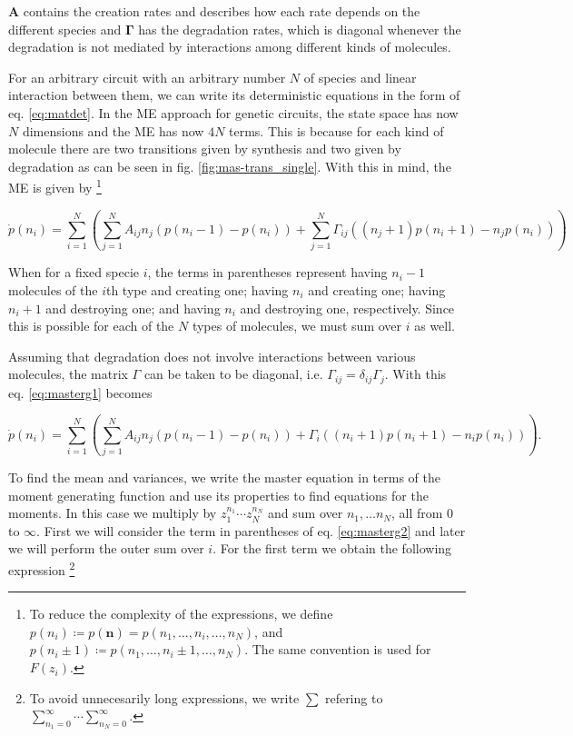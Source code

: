 $\mathbf{A}$ contains the creation rates and describes how each rate depends on the different species and $\mathbf{\Gamma}$ has the degradation rates, which is diagonal whenever the degradation is not mediated by interactions among different kinds of molecules.

For an arbitrary circuit with an arbitrary number $N$ of species and linear interaction between them, we can write its deterministic equations in the form of eq. \eqref{eq:matdet}. In the ME approach for genetic circuits, the state space has now $N$ dimensions and the ME has now $4N$ terms. This is because for each kind of molecule there are two transitions given by synthesis and two given by degradation as can be seen in fig. \ref{fig:mas-trans_single}. With this in mind, the ME is given by \footnote{To reduce the complexity of the expressions, we define $p(n_i) \coloneqq p(\mathbf{n}) = p(n_1,\dotsc,n_i,\dotsc,n_N)$, and $p(n_i\pm1)\coloneqq p(n_1,\dotsc,n_i\pm1,\dotsc,n_N)$. The same convention is used for $F(z_i)$.}

\begin{equation}
  \label{eq:masterg1}
  \dot{p}(n_i) =  \sum_{i=1}^N\left(\sum_{j=1}^N A_{ij}n_j \left( p(n_i-1) - p(n_i) \right) + \sum_{j=1}^N \Gamma_{ij}((n_j+1)p(n_i+1)-n_jp(n_i))\right)
\end{equation}

When for a fixed specie $i$, the terms in parentheses represent having $n_i-1$ molecules of the $i$th type and creating one; having $n_i$ and creating one; having $n_i+1$ and destroying one; and having $n_i$ and destroying one, respectively. Since this is possible for each of the $N$ types of molecules, we must sum over $i$ as well.

Assuming that degradation does not involve interactions between various molecules, the matrix $\Gamma$ can be taken to be diagonal, i.e. $\Gamma_{ij}=\delta_{ij}\Gamma_j$. With this eq. \eqref{eq:masterg1} becomes

\begin{equation}
\label{eq:masterg2}
\dot{p}(n_i) =  \sum_{i=1}^N\left(\sum_{j=1}^N A_{ij}n_j \left( p(n_i-1) - p(n_i) \right) + \Gamma_{i}((n_i+1)p(n_i+1)-n_ip(n_i))\right).
\end{equation}

To find the mean and variances, we write the master equation in terms of the moment generating function and use its properties to find equations for the moments. In this case we multiply by $z_1^{n_1}\dotsm z_N^{n_N}$ and sum over $n_1,\dotsc n_N$, all from $0$ to $\infty$. First we will consider the term in parentheses of eq. \eqref{eq:masterg2} and later we will perform the outer sum over $i$. For the first term we obtain the following expression \footnote{To avoid unnecesarily long expressions, we write $\sum$ refering to $\sum_{n_1=0}^\infty\dotsi\sum_{n_N=0}^\infty$.}

